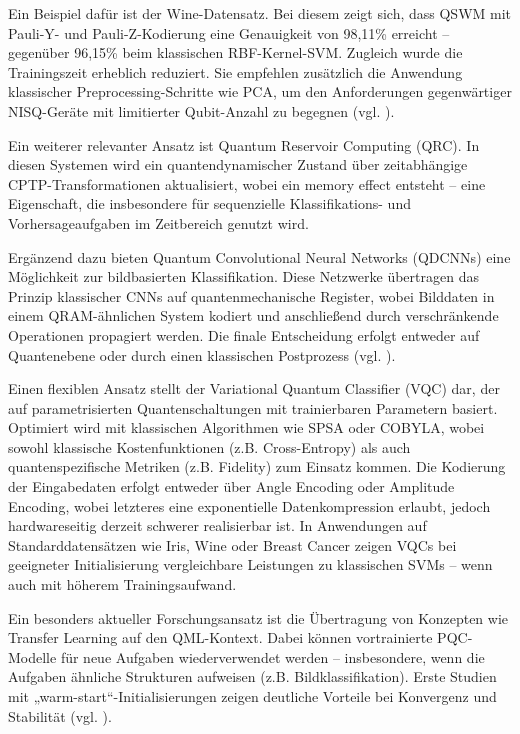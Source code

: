 Ein Beispiel dafür ist der Wine-Datensatz. Bei diesem zeigt sich, dass QSWM mit Pauli-Y- und Pauli-Z-Kodierung eine Genauigkeit von 98{,}11\% erreicht – gegenüber 96{,}15\% beim klassischen RBF-Kernel-SVM. Zugleich wurde die Trainingszeit erheblich reduziert. Sie empfehlen zusätzlich die Anwendung klassischer Preprocessing-Schritte wie PCA, um den Anforderungen gegenwärtiger NISQ-Geräte mit limitierter Qubit-Anzahl zu begegnen (vgl. \cite{kavithaQuantumMachineLearning2024}).


Ein weiterer relevanter Ansatz ist Quantum Reservoir Computing (QRC). In diesen Systemen wird ein quantendynamischer Zustand über zeitabhängige CPTP-Transformationen aktualisiert, wobei ein memory effect entsteht – eine Eigenschaft, die insbesondere für sequenzielle Klassifikations- und Vorhersageaufgaben im Zeitbereich genutzt wird.

Ergänzend dazu bieten Quantum Convolutional Neural Networks (QDCNNs) eine Möglichkeit zur bildbasierten Klassifikation. Diese Netzwerke übertragen das Prinzip klassischer CNNs auf quantenmechanische Register, wobei Bilddaten in einem QRAM-ähnlichen System kodiert und anschließend durch verschränkende Operationen propagiert werden. Die finale Entscheidung erfolgt entweder auf Quantenebene oder durch einen klassischen Postprozess (vgl. \cite{peral-garciaSystematicLiteratureReview2024}).

Einen flexiblen Ansatz stellt der Variational Quantum Classifier (VQC) dar, der auf parametrisierten Quantenschaltungen mit trainierbaren Parametern basiert. Optimiert wird mit klassischen Algorithmen wie SPSA oder COBYLA, wobei sowohl klassische Kostenfunktionen (z.B. Cross-Entropy) als auch quantenspezifische Metriken (z.B. Fidelity) zum Einsatz kommen. Die Kodierung der Eingabedaten erfolgt entweder über Angle Encoding oder Amplitude Encoding, wobei letzteres eine exponentielle Datenkompression erlaubt, jedoch hardwareseitig derzeit schwerer realisierbar ist. In Anwendungen auf Standarddatensätzen wie Iris, Wine oder Breast Cancer zeigen VQCs bei geeigneter Initialisierung vergleichbare Leistungen zu klassischen SVMs – wenn auch mit höherem Trainingsaufwand.

Ein besonders aktueller Forschungsansatz ist die Übertragung von Konzepten wie Transfer Learning auf den QML-Kontext. Dabei können vortrainierte PQC-Modelle für neue Aufgaben wiederverwendet werden – insbesondere, wenn die Aufgaben ähnliche Strukturen aufweisen (z.B. Bildklassifikation). Erste Studien mit „warm-start“-Initialisierungen zeigen deutliche Vorteile bei Konvergenz und Stabilität (vgl. \cite{gujjuQuantumMachineLearning2024}).


